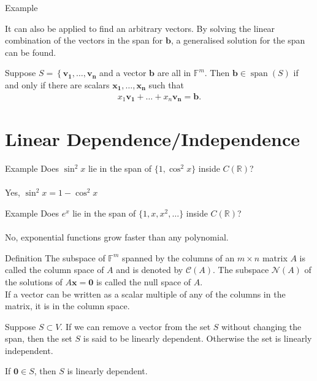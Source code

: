 \documentclass{report}
\renewcommand{\vec}{\mathbf}
\newcommand{\Span}{\operatorname{span}}
\begin{document}
\begin{enumerate}
\begin{question}{Example}
		\end{question}

		It can also be applied to find an arbitrary vectors. By solving the linear combination of the vectors in the span for $\vec{b}$, a generalised solution for the span can be found.

		Suppose $S = \left\{\vec{v_1},\dots,\vec{v_n}$ and a vector $\vec{b}$ are all in $\mathbb{F}^m$. Then $\vec{b} \in \Span(S)$ if and only if there are scalars $\vec{x_1,\dots,x_n}$ such that
			\begin{align*}
				x_1\vec{v_1} + \dots + x_n\vec{v_n} = \vec{b}.
			\end{align*}

\chapter{Linear Dependence/Independence}

	\begin{question}{Example}
		Does $\sin^2x$ lie in the span of $\{1, \cos^2x\}$ inside $C(\mathbb{R})$?
		\\ \\
		Yes, $\sin^2x = 1 - \cos^2x$
	\end{question}

	\begin{question}{Example}
		Does $e^x$ lie in the span of $\{1,x,x^2,\dots\}$ inside $C(\mathbb{R})$?
		\\ \\
		No, exponential functions grow faster than any polynomial.
	\end{question}

	\begin{question}{Definition}
				The subspace of $\mathbb{F}^m$ spanned by the columns of an $m \times n$ matrix $A$ is called the column space of $A$ and is denoted by $\mathcal{C}(A)$. The subspace $\mathcal{N}(A)$ of the solutions of $A\vec{x} = \vec{0}$ is called the null space of $A$.
				\\
				If a vector can be written as a scalar multiple of any of the columns in the matrix, it is in the column space.
	\end{question}


	Suppose $S \subset V$. If we can remove a vector from the set $S$ without changing the span, then the set $S$ is said to be linearly dependent. Otherwise the set is linearly independent.

	If $\vec{0} \in S$, then $S$ is linearly dependent.


\end{enumerate}
\end{document}
